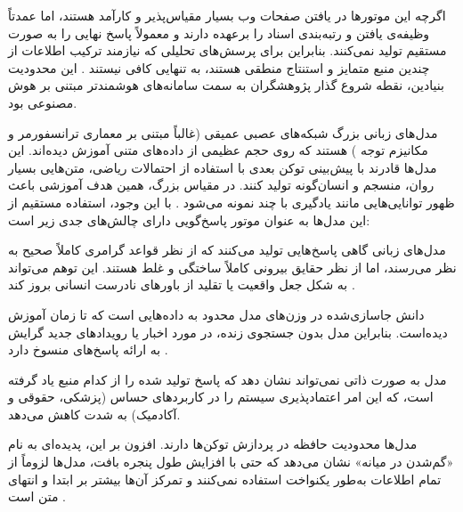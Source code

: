 
اگرچه این موتورها در یافتن صفحات وب بسیار مقیاس‌پذیر و کارآمد هستند، اما عمدتاً وظیفه‌ی یافتن و رتبه‌بندی اسناد را برعهده دارند و معمولاً پاسخ نهایی را به صورت مستقیم تولید نمی‌کنند. بنابراین برای پرسش‌های تحلیلی که نیازمند ترکیب اطلاعات از چندین منبع متمایز و استنتاج منطقی هستند، به تنهایی کافی نیستند \cite{metzler2021rethink}. این محدودیت بنیادین، نقطه شروع گذار پژوهشگران به سمت سامانه‌های هوشمندتر مبتنی بر هوش مصنوعی بود.


مدل‌های زبانی بزرگ شبکه‌های عصبی عمیقی (غالباً مبتنی بر معماری ترانسفورمر و مکانیزم توجه \cite{vaswani2017attention}) هستند که روی حجم عظیمی از داده‌های متنی آموزش دیده‌اند. این مدل‌ها قادرند با پیش‌بینی توکن بعدی با استفاده از احتمالات ریاضی، متن‌هایی بسیار روان، منسجم و انسان‌گونه تولید کنند. در مقیاس بزرگ، همین هدف آموزشی باعث ظهور توانایی‌هایی مانند یادگیری با چند نمونه می‌شود \cite{brown2020language}. با این وجود، استفاده مستقیم از این مدل‌ها به عنوان موتور پاسخ‌گویی دارای چالش‌های جدی زیر است:


  مدل‌های زبانی گاهی پاسخ‌هایی تولید می‌کنند که از نظر قواعد گرامری کاملاً صحیح به نظر می‌رسند، اما از نظر حقایق بیرونی کاملاً ساختگی و غلط هستند. این توهم می‌تواند به شکل جعل واقعیت یا تقلید از باورهای نادرست انسانی بروز کند \cite{huang2025hallucination, lin2022truthfulqa}.

  دانش جاسازی‌شده در وزن‌های مدل محدود به داده‌هایی است که تا زمان آموزش دیده‌است. بنابراین مدل بدون جستجوی زنده، در مورد اخبار یا رویدادهای جدید گرایش به ارائه پاسخ‌های منسوخ دارد \cite{kasai2024realtimeqa}.

  مدل به صورت ذاتی نمی‌تواند نشان دهد که پاسخ تولید شده را از کدام منبع یاد گرفته است، که این امر اعتمادپذیری سیستم را در کاربردهای حساس (پزشکی، حقوقی و آکادمیک) به شدت کاهش می‌دهد.

  مدل‌ها محدودیت حافظه در پردازش توکن‌ها دارند. افزون بر این، پدیده‌ای به نام «گم‌شدن در میانه» نشان می‌دهد که حتی با افزایش طول پنجره بافت، مدل‌ها لزوماً از تمام اطلاعات به‌طور یکنواخت استفاده نمی‌کنند و تمرکز آن‌ها بیشتر بر ابتدا و انتهای متن است \cite{liu2024lost}.

